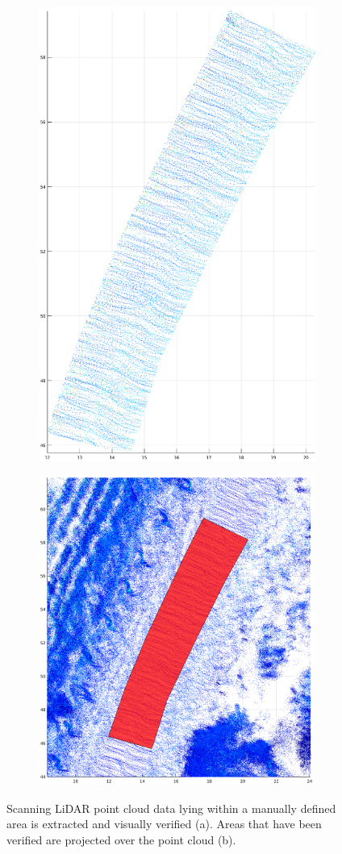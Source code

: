 \documentclass[numbered,pdftex]{ohio-etd}
\begin{document}
{{{{				\begin{figure}[H]
					\centering
					\begin{subfigure}{0.45\textwidth}
						\centering
						\includegraphics[width=1.0\linewidth,height=8.0 cm,keepaspectratio]{Defense_Images/visual_verification_1}
						\caption[Bean Hollow Road Satellite View]{}
						\label{fig:post_area_selected}
					\end{subfigure}
					\begin{subfigure}{0.45\textwidth}
						\centering
						\includegraphics[width=1.0\linewidth,height=8.0 cm,keepaspectratio]{Defense_Images/post_area_selected}
						\caption[Bean Hollow Road Camera View]{}
						\label{fig:visual_verification_1}
					\end{subfigure}
					\caption[Manual Classification Visual Verification]{Scanning LiDAR point cloud data lying within a manually defined area is extracted and visually verified (a). Areas that have been verified are projected over the point cloud (b).}
					\label{fig:Visual_Verification}
				\end{figure}
	
}}}}
\end{document}
